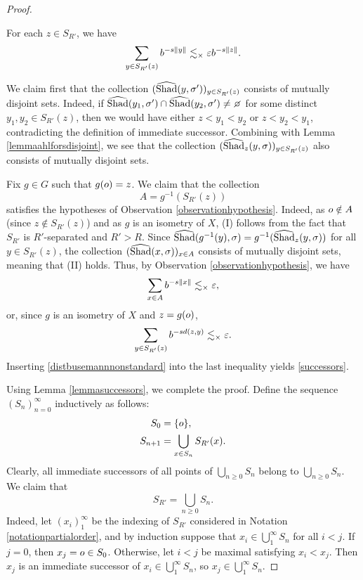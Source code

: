\begin{proof}
\begin{lemma}
\label{lemmasuccessors}
For each $z\in S_{R'}$, we have
\begin{equation}
\label{successors}
\sum_{y\in S_{R'}(z)}b^{-s\|y\|} \lesssim_\times \varepsilon b^{-s\|z\|}.
\end{equation}
\end{lemma}
\begin{subproof}
We claim first that the collection $(\widehat{\operatorname{Shad}}(y,\sigma'))_{y\in S_{R'}(z)}$ consists of mutually disjoint sets. Indeed, if $\what\Shad(y_1,\sigma')\cap \what\Shad(y_2,\sigma')\neq\emptyset$ for some distinct $y_1,y_2\in S_{R'}(z)$, then we would have either $z < y_1 < y_2$ or $z < y_2 < y_1$, contradicting the definition of immediate successor. Combining with Lemma \ref{lemmaahlforsdisjoint}, we see that the collection $(\widehat{\operatorname{Shad}}_z(y,\sigma))_{y\in S_{R'}(z)}$ also consists of mutually disjoint sets.

Fix $g\in G$ such that $g(o) = z$. We claim that the collection
\[
A = g^{-1}(S_{R'}(z))
\]
satisfies the hypotheses of Observation \ref{observationhypothesis}. Indeed, as $o\notin A$ (since $z\notin S_{R'}(z)$) and as $g$ is an isometry of $X$, (I) follows from the fact that $S_{R'}$ is $R'$-separated and $R' > R$. Since $\widehat{\operatorname{Shad}}(g^{-1}(y),\sigma) = g^{-1}(\widehat{\operatorname{Shad}}_z(y,\sigma))$ for all $y\in S_{R'}(z)$, the collection $(\widehat{\operatorname{Shad}}(x,\sigma))_{x\in A}$ consists of mutually disjoint sets, meaning that (II) holds. Thus, by Observation \ref{observationhypothesis}, we have
\[
\sum_{x\in A}b^{-s\|x\|} \lesssim_\times \varepsilon,
\]
or, since $g$ is an isometry of $X$ and $z=g(o)$,
\[
\sum_{y\in S_{R'}(z)}b^{-sd(z,y)} \lesssim_\times \varepsilon.
\]
Inserting \eqref{distbusemannnonstandard} into the last inequality yields \eqref{successors}.
\end{subproof}

Using Lemma \ref{lemmasuccessors}, we complete the proof. Define the sequence $(S_n)_{n = 0}^\infty$ inductively as follows:
\begin{align*}
S_0 &= \{o\}, \\
S_{n + 1} &= \bigcup_{x\in S_n}S_{R'}(x). 
\end{align*}
Clearly, all immediate successors of all points of $\bigcup_{n\geq 0}S_n$ belong to $\bigcup_{n\geq 0}S_n$. We claim that
\[
S_{R'} = \bigcup_{n\geq 0}S_n.
\]
Indeed, let $(x_i)_1^\infty$ be the indexing of $S_{R'}$ considered in Notation \ref{notationpartialorder}, and by induction suppose that $x_i\in \bigcup_1^\infty S_n$ for all $i < j$. If $j = 0$, then $x_j = o\in S_0$. Otherwise, let $i < j$ be maximal satisfying $x_i < x_j$. Then $x_j$ is an immediate successor of $x_i\in \bigcup_1^\infty S_n$, so $x_j\in \bigcup_1^\infty S_n$.


\end{proof}
